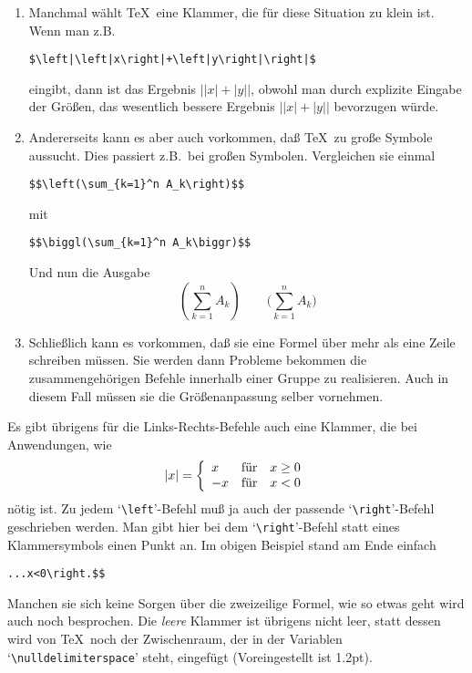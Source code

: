 \begin{enumerate}
\item Manchmal w\"ahlt \TeX\ eine Klammer, die f\"ur diese Situation zu
klein ist. Wenn man z.B.
\begin{verbatim}
$\left|\left|x\right|+\left|y\right|\right|$
\end{verbatim}
eingibt, dann ist das Ergebnis
$\left|\left|x\right|+\left|y\right|\right|$, obwohl man durch
explizite Eingabe der Gr\"o\ss{}en, das wesentlich bessere Ergebnis
$\bigl|\left|x\right|+\left|y\right|\bigr|$ bevorzugen w\"urde.
\item Andererseits kann es aber auch vorkommen, da\ss{} \TeX\ zu gro\ss{}e
Symbole aussucht. Dies passiert z.B.\ bei gro\ss{}en Symbolen. Vergleichen
sie einmal
\begin{verbatim}
$$\left(\sum_{k=1}^n A_k\right)$$
\end{verbatim}
mit
\begin{verbatim}
$$\biggl(\sum_{k=1}^n A_k\biggr)$$
\end{verbatim}
Und nun die Ausgabe
$$\left(\sum_{k=1}^n A_k\right)\qquad\biggl(\sum_{k=1}^n A_k\biggr)$$
\item Schlie\ss{}lich kann es vorkommen, da\ss{} sie eine Formel \"uber mehr als
eine Zeile schreiben m\"ussen. Sie werden dann Probleme bekommen die
zusammengeh\"origen Befehle innerhalb einer Gruppe zu realisieren. Auch
in diesem Fall m\"ussen sie die Gr\"o\ss{}enanpassung selber vornehmen.
\end{enumerate}
Es gibt \"ubrigens f\"ur die Links-Rechts-Befehle auch eine
Klammer, die bei Anwendungen, wie
$$|x|=\left\{\begin{array}{ll}
x & \mbox{f\"ur\quad}x\ge0\\
-x & \mbox{f\"ur\quad}x<0\end{array}\right.$$
n\"otig ist. Zu jedem `\verb|\left|'-Befehl mu\ss{} ja auch der passende
`\verb|\right|'-Befehl geschrieben werden. Man gibt hier bei dem
`\verb|\right|'-Befehl statt eines Klammersymbols einen 
Punkt an. Im
obigen Beispiel stand am Ende einfach
\begin{verbatim}
...x<0\right.$$
\end{verbatim}
Manchen sie sich keine Sorgen \"uber die zweizeilige Formel, wie so
etwas geht wird auch noch besprochen. Die {\em leere} Klammer ist
\"ubrigens nicht leer, statt dessen wird von \TeX\ noch der
Zwischenraum, der in der Variablen 
`\verb|\nulldelimiterspace|' steht,
eingef\"ugt (Voreingestellt ist 1.2pt).
